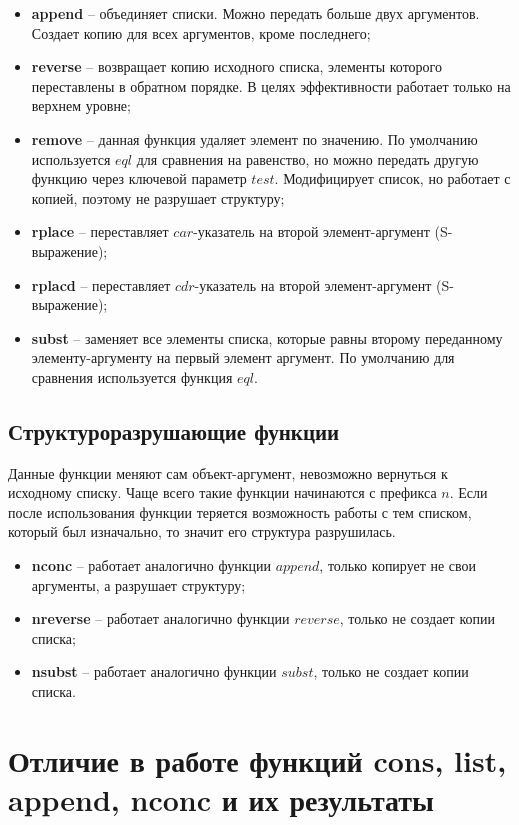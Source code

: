 \documentclass[a4paper,14pt, unknownkeysallowed]{extreport}
\begin{document}
\begin{itemize}
	\item \textbf{append} -- объединяет списки. Можно передать больше двух аргументов. Создает копию для всех аргументов, кроме последнего;
	\item \textbf{reverse} -- возвращает копию исходного списка, элементы которого переставлены в обратном порядке. В целях эффективности работает только на верхнем уровне;
	\item \textbf{remove} -- данная функция удаляет элемент по значению. По умолчанию используется $eql$ для сравнения на равенство, но можно передать другую функцию через ключевой параметр $test$. Модифицирует список, но работает с копией, поэтому не разрушает структуру;
	\item \textbf{rplace} -- переставляет $car$-указатель на второй элемент-аргумент (S-выражение);
	\item \textbf{rplacd} -- переставляет $cdr$-указатель на второй элемент-аргумент (S-выражение);
	\item \textbf{subst} -- заменяет все элементы списка, которые равны второму переданному элементу-аргументу на первый элемент аргумент. По умолчанию для сравнения используется функция $eql$.
\end{itemize}

\subsection{Структуроразрушающие функции}

Данные функции меняют сам объект-аргумент, невозможно вернуться к исходному списку. Чаще всего такие функции начинаются с префикса $n$. Если после использования функции теряется возможность работы с тем списком, который был изначально, то значит его структура разрушилась.

\begin{itemize}
	\item \textbf{nconc} -- работает аналогично функции $append$, только копирует не свои аргументы, а разрушает структуру;
	\item \textbf{nreverse} -- работает аналогично функции $reverse$, только не создает копии списка;
	\item \textbf{nsubst} -- работает аналогично функции $subst$, только не создает копии списка.
\end{itemize}

\section{Отличие в работе функций cons, list, append, nconc и их результаты}
\end{document}
